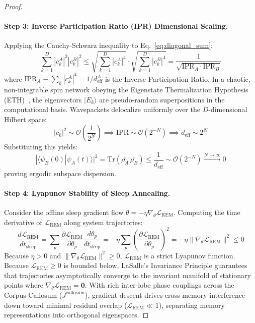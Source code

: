 \documentclass[10pt,twocolumn,3p]{article}
\begin{document}
\begin{proof}
\paragraph{Step 3: Inverse Participation Ratio (IPR) Dimensional Scaling.}
Applying the Cauchy-Schwarz inequality to Eq.~\eqref{eq:diagonal_sum}:
\begin{equation}
    \sum_{k=1}^D |c_k^A|^2 |c_k^B|^2 \le \sqrt{\sum_{k=1}^D |c_k^A|^4} \cdot \sqrt{\sum_{k=1}^D |c_k^B|^4} = \frac{1}{\sqrt{\text{IPR}_A \cdot \text{IPR}_B}}
\end{equation}
where $\text{IPR}_A \equiv \sum_k |c_k^A|^4 = 1/d_{\text{eff}}^A$ is the Inverse Participation Ratio. In a chaotic, non-integrable spin network obeying the Eigenstate Thermalization Hypothesis (ETH)~\cite{deutsch1991,srednicki1994}, the eigenvectors $|E_k\rangle$ are pseudo-random superpositions in the computational basis. Wavepackets delocalize uniformly over the $D$-dimensional Hilbert space:
\begin{equation}
    |c_k|^2 \sim \mathcal{O}\left(\frac{1}{2^N}\right) \implies \text{IPR} \sim \mathcal{O}\left(2^{-N}\right) \implies d_{\text{eff}} \sim 2^N
\end{equation}
Substituting this yields:
\begin{equation}
    \overline{|\langle \psi_B(0) | \psi_A(t) \rangle|^2} = \text{Tr}(\overline{\rho_A} \, \overline{\rho_B}) \le \frac{1}{d_{\text{eff}}} \sim \mathcal{O}(2^{-N}) \xrightarrow{N \to \infty} 0
\end{equation}
proving ergodic subspace dispersion.

\paragraph{Step 4: Lyapunov Stability of Sleep Annealing.}
Consider the offline sleep gradient flow $\dot{\theta} = -\eta \nabla_\theta \mathcal{L}_{\text{REM}}$. Computing the time derivative of $\mathcal{L}_{\text{REM}}$ along system trajectories:
\begin{equation}
    \frac{d \mathcal{L}_{\text{REM}}}{dt_{\text{sleep}}} = \sum_p \frac{\partial \mathcal{L}_{\text{REM}}}{\partial \theta_p} \frac{d\theta_p}{dt_{\text{sleep}}} = -\eta \sum_p \left( \frac{\partial \mathcal{L}_{\text{REM}}}{\partial \theta_p} \right)^2 = -\eta \|\nabla_\theta \mathcal{L}_{\text{REM}}\|^2 \le 0
\end{equation}
Because $\eta > 0$ and $\|\nabla_\theta \mathcal{L}_{\text{REM}}\|^2 \ge 0$, $\mathcal{L}_{\text{REM}}$ is a strict Lyapunov function. Because $\mathcal{L}_{\text{REM}} \ge 0$ is bounded below, LaSalle's Invariance Principle guarantees that trajectories asymptotically converge to the invariant manifold of stationary points where $\nabla_\theta \mathcal{L}_{\text{REM}} = \mathbf{0}$. With rich inter-lobe phase couplings across the Corpus Callosum ($J^{\text{callosum}}$), gradient descent drives cross-memory interference down toward minimal residual overlap ($\mathcal{L}_{\text{REM}} \ll 1$), separating memory representations into orthogonal eigenspaces.


\end{proof}
\end{document}

